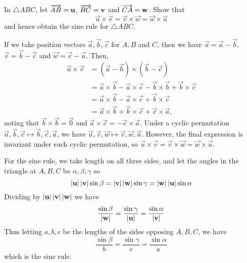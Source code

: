 \documentclass[12pt]{article}
\begin{document}
    \begin{question}
        In $\triangle ABC$, let $\overrightarrow{AB} = \mathbf{u}$, $\overrightarrow{BC} = \mathbf{v}$ and $\overrightarrow{CA} = \mathbf{w}$.
        Show that
        \[
        \vec{u}\times\vec{v}=\vec{v}\times\vec{w}=\vec{w}\times\vec{u}
        \]
        and hence obtain the sine rule for $\triangle ABC$.
    \end{question}
    \begin{answer}
        If we take position vectors $\vec{a},\vec{b},\vec{c}$
        for $A,B$ and $C$,
        then we have $\vec{u} = \vec{a} - \vec{b}$,
        $\vec{v} = \vec{b} - \vec{c}$ and $\vec{w} = \vec{c} - \vec{a}$.
        Then,
        \begin{align*}
            \vec{u}\times\vec{v}
            &= (\vec{a}-\vec{b})\times(\vec{b}-\vec{c})\\
            &= \vec{a}\times\vec{b}-\vec{a}\times\vec{c}
            -\vec{b}\times\vec{b}+\vec{b}\times\vec{c}\\
            &= \vec{a}\times\vec{b}-\vec{a}\times\vec{c}+\vec{b}\times\vec{c}\\
            &= \vec{a}\times\vec{b}+\vec{b}\times\vec{c}+\vec{c}\times\vec{a},
        \end{align*}
        noting that $\vec{b}\times\vec{b}=\vec{0}$ and $\vec{a}\times\vec{c} = -\vec{c}\times\vec{a}$.
        Under a cyclic permutation 
        $\vec{a},\vec{b},\vec{c} \mapsto \vec{b},\vec{c},\vec{a}$,
        we have $\vec{u},\vec{v},\vec{w}\mapsto\vec{v},\vec{w},\vec{u}$.
        However, the final expression is invariant under such
        cyclic permutation, so $\vec{u}\times\vec{v}=\vec{v}\times\vec{w}=\vec{w}\times\vec{u}$.

        For the sine rule, we take length on all three sides, 
        and let the angles in the triangle at $A,B,C$ be $\alpha,\beta,\gamma$ so
        \[
            \left\lvert \mathbf{u} \right\rvert\left\lvert \mathbf{v} \right\rvert\sin\beta = \left\lvert \mathbf{v} \right\rvert\left\lvert \mathbf{w} \right\rvert\sin\gamma
            = \left\lvert \mathbf{w} \right\rvert\left\lvert \mathbf{u} \right\rvert\sin\alpha
        \]
        Dividing by $\left\lvert \mathbf{u} \right\rvert\left\lvert \mathbf{v} \right\rvert\left\lvert \mathbf{w} \right\rvert$ we have
        \[
            \frac{\sin\beta}{\left\lvert \mathbf{w} \right\rvert} = \frac{\sin\gamma}{\left\lvert \mathbf{u} \right\rvert}
            = \frac{\sin\alpha}{\left\lvert \mathbf{v} \right\rvert}
        \]
        Thus letting $a,b,c$ be the lengths of the sides opposing $A,B,C$, we have
        \[
            \frac{\sin\beta}{b} = \frac{\sin\gamma}{c}
            = \frac{\sin\alpha}{a}
        \]
        which is the sine rule.
    \end{answer}
\end{document}
